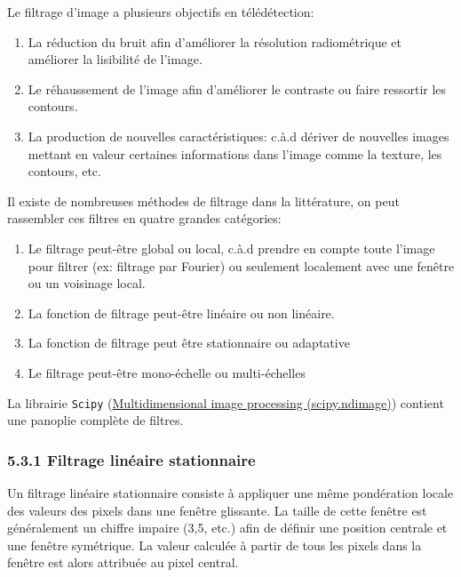 \documentclass[
]{article}
\begin{document}
Le filtrage d'image a plusieurs objectifs en télédétection:

\begin{enumerate}
\def\labelenumi{\arabic{enumi}.}
\item
  La réduction du bruit afin d'améliorer la résolution radiométrique et
  améliorer la lisibilité de l'image.
\item
  Le réhaussement de l'image afin d'améliorer le contraste ou faire
  ressortir les contours.
\item
  La production de nouvelles caractéristiques: c.à.d dériver de
  nouvelles images mettant en valeur certaines informations dans l'image
  comme la texture, les contours, etc.
\end{enumerate}

Il existe de nombreuses méthodes de filtrage dans la littérature, on
peut rassembler ces filtres en quatre grandes catégories:

\begin{enumerate}
\def\labelenumi{\arabic{enumi}.}
\item
  Le filtrage peut-être global ou local, c.à.d prendre en compte toute
  l'image pour filtrer (ex: filtrage par Fourier) ou seulement
  localement avec une fenêtre ou un voisinage local.
\item
  La fonction de filtrage peut-être linéaire ou non linéaire.
\item
  La fonction de filtrage peut être stationnaire ou adaptative
\item
  Le filtrage peut-être mono-échelle ou multi-échelles
\end{enumerate}

La librairie \texttt{Scipy}
(\href{https://docs.scipy.org/doc/scipy/reference/ndimage.html}{Multidimensional
image processing (scipy.ndimage)}) contient une panoplie complète de
filtres.

\subsubsection{\texorpdfstring{{5.3.1} Filtrage linéaire
stationnaire}{5.3.1 Filtrage linéaire stationnaire}}\label{filtrage-linuxe9aire-stationnaire}

Un filtrage linéaire stationnaire consiste à appliquer une même
pondération locale des valeurs des pixels dans une fenêtre glissante. La
taille de cette fenêtre est généralement un chiffre impaire (3,5, etc.)
afin de définir une position centrale et une fenêtre symétrique. La
valeur calculée à partir de tous les pixels dans la fenêtre est alors
attribuée au pixel central.
\end{document}
